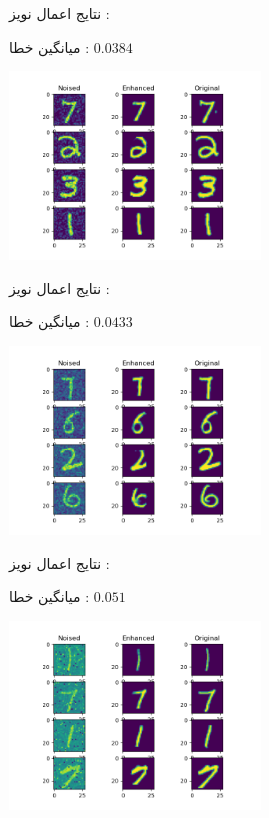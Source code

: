 \documentclass[12pt,titlepage,a4page , tikz , multi,table , svgnames,xcdraw]{article}
\begin{document}
\hrulefill




نتایج اعمال نویز :

میانگین خطا : $
0.0384$

\begin{center}

 \includegraphics[width=0.5\textwidth]{pictures/22.png}

\end{center}

\hrulefill


\newpage






نتایج اعمال نویز :

میانگین خطا : $
0.0433$

\begin{center}

 \includegraphics[width=0.5\textwidth]{pictures/23.png}

\end{center}


\hrulefill


نتایج اعمال نویز :

میانگین خطا : $0.051$

\begin{center}

 \includegraphics[width=0.5\textwidth]{pictures/21.png}

\end{center}
\end{document}
